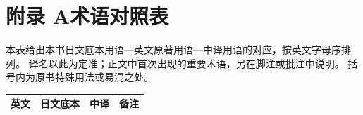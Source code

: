 \chapter*{附录 A\quad 术语对照表}

本表给出本书日文底本用语—英文原著用语—中译用语的对应，按英文字母序排列。
译名以此为定准；正文中首次出现的重要术语，另在脚注或批注中说明。
括号内为原书特殊用法或易混之处。

\begin{longtable}{@{}>{\raggedright\arraybackslash}p{}>{\raggedright\arraybackslash}p{}>{\raggedright\arraybackslash}p{}>{\raggedright\arraybackslash}p{}@{}}
\toprule
\textbf{英文} & \textbf{日文底本} & \textbf{中译} & \textbf{备注} \\
\midrule
\endhead


\end{longtable}
